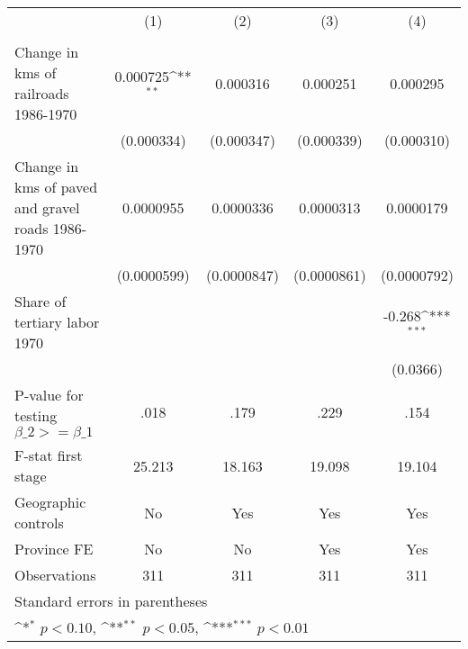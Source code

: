 {
\def\sym#1{\ifmmode^{#1}\else\(^{#1}\)\fi}
\begin{tabular}{l*{4}{c}}
\hline\hline
                &\multicolumn{1}{c}{(1)}&\multicolumn{1}{c}{(2)}&\multicolumn{1}{c}{(3)}&\multicolumn{1}{c}{(4)}\\
                &\multicolumn{1}{c}{}&\multicolumn{1}{c}{}&\multicolumn{1}{c}{}&\multicolumn{1}{c}{}\\
\hline
Change in kms of railroads 1986-1970& 0.000725\sym{**} & 0.000316         & 0.000251         & 0.000295         \\
                &(0.000334)         &(0.000347)         &(0.000339)         &(0.000310)         \\
[1em]
Change in kms of paved and gravel roads 1986-1970&0.0000955         &0.0000336         &0.0000313         &0.0000179         \\
                &(0.0000599)         &(0.0000847)         &(0.0000861)         &(0.0000792)         \\
[1em]
Share of tertiary labor 1970&                  &                  &                  &   -0.268\sym{***}\\
                &                  &                  &                  & (0.0366)         \\
\hline
P-value for testing $\beta\_{2} >= \beta\_{1}$&     .018         &     .179         &     .229         &     .154         \\
F-stat first stage&   25.213         &   18.163         &   19.098         &   19.104         \\
Geographic controls&       No         &      Yes         &      Yes         &      Yes         \\
Province FE     &       No         &       No         &      Yes         &      Yes         \\
Observations    &      311         &      311         &      311         &      311         \\
\hline\hline
\multicolumn{5}{l}{\footnotesize Standard errors in parentheses}\\
\multicolumn{5}{l}{\footnotesize \sym{*} \(p<0.10\), \sym{**} \(p<0.05\), \sym{***} \(p<0.01\)}\\
\end{tabular}
}
